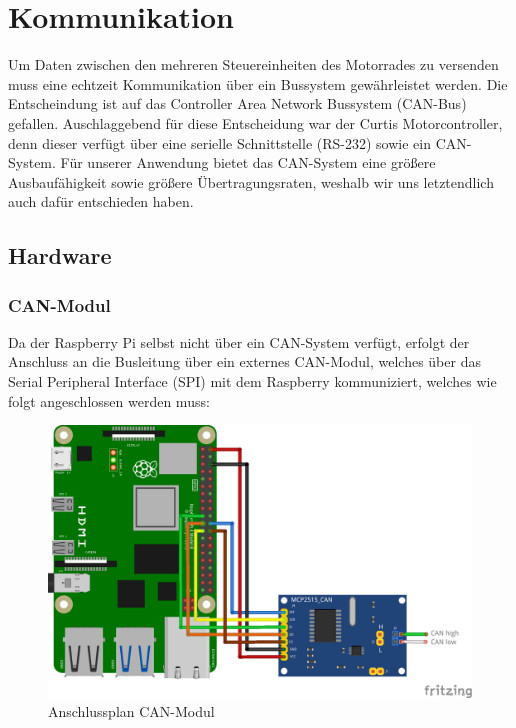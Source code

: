 \newpage


\section{Kommunikation}
Um Daten zwischen den mehreren Steuereinheiten des Motorrades zu versenden muss eine echtzeit Kommunikation über ein Bussystem gewährleistet werden. Die Entscheindung ist auf das Controller Area Network Bussystem (CAN-Bus) gefallen. Auschlaggebend für diese Entscheidung war der Curtis Motorcontroller, denn dieser verfügt über eine serielle Schnittstelle (RS-232) sowie ein CAN-System. Für unserer Anwendung bietet das CAN-System eine größere Ausbaufähigkeit sowie größere Übertragungsraten, weshalb wir uns letztendlich auch dafür entschieden haben.
\subsection{Hardware}
\subsubsection{CAN-Modul}
Da der Raspberry Pi selbst nicht über ein CAN-System verfügt, erfolgt der Anschluss an die Busleitung über ein externes CAN-Modul, welches über das Serial Peripheral Interface (SPI) mit dem Raspberry kommuniziert, welches wie folgt angeschlossen werden muss: 
\begin{figure}[H]
	\begin{center}
		\includegraphics[scale=0.9]{figures/hcis/can_module.png}
		\caption{Anschlussplan CAN-Modul}
	\end{center}
\end{figure}

